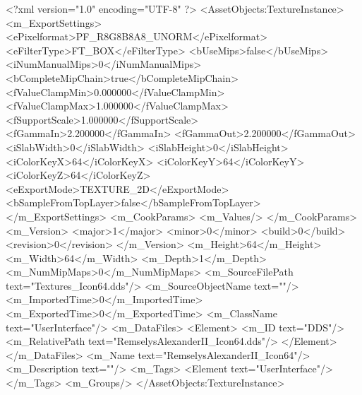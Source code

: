 <?xml version="1.0" encoding="UTF-8" ?>
<AssetObjects:TextureInstance>
	<m_ExportSettings>
		<ePixelformat>PF_R8G8B8A8_UNORM</ePixelformat>
		<eFilterType>FT_BOX</eFilterType>
		<bUseMips>false</bUseMips>
		<iNumManualMips>0</iNumManualMips>
		<bCompleteMipChain>true</bCompleteMipChain>
		<fValueClampMin>0.000000</fValueClampMin>
		<fValueClampMax>1.000000</fValueClampMax>
		<fSupportScale>1.000000</fSupportScale>
		<fGammaIn>2.200000</fGammaIn>
		<fGammaOut>2.200000</fGammaOut>
		<iSlabWidth>0</iSlabWidth>
		<iSlabHeight>0</iSlabHeight>
		<iColorKeyX>64</iColorKeyX>
		<iColorKeyY>64</iColorKeyY>
		<iColorKeyZ>64</iColorKeyZ>
		<eExportMode>TEXTURE_2D</eExportMode>
		<bSampleFromTopLayer>false</bSampleFromTopLayer>
	</m_ExportSettings>
	<m_CookParams>
		<m_Values/>
	</m_CookParams>
	<m_Version>
		<major>1</major>
		<minor>0</minor>
		<build>0</build>
		<revision>0</revision>
	</m_Version>
	<m_Height>64</m_Height>
	<m_Width>64</m_Width>
	<m_Depth>1</m_Depth>
	<m_NumMipMaps>0</m_NumMipMaps>
	<m_SourceFilePath text="Textures\RemselysAlexanderII_Icon64.dds"/>
	<m_SourceObjectName text=""/>
	<m_ImportedTime>0</m_ImportedTime>
	<m_ExportedTime>0</m_ExportedTime>
	<m_ClassName text="UserInterface"/>
	<m_DataFiles>
		<Element>
			<m_ID text="DDS"/>
			<m_RelativePath text="RemselysAlexanderII_Icon64.dds"/>
		</Element>
	</m_DataFiles>
	<m_Name text="RemselysAlexanderII_Icon64"/>
	<m_Description text=""/>
	<m_Tags>
		<Element text="UserInterface"/>
	</m_Tags>
	<m_Groups/>
</AssetObjects:TextureInstance>
